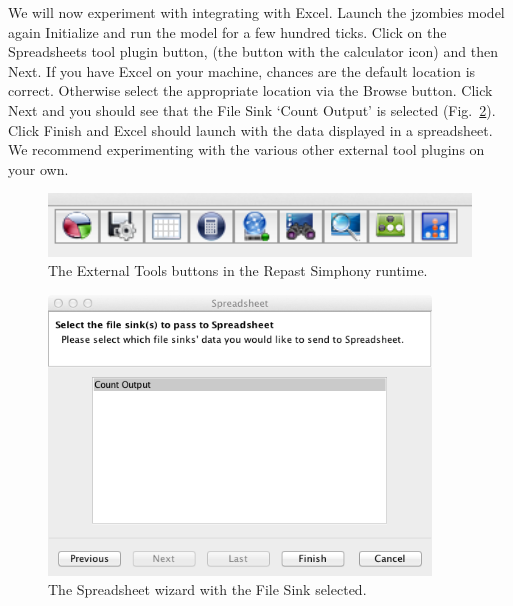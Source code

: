\documentclass[11pt]{amsart}
\begin{document}
We will now experiment with integrating with Excel. Launch the jzombies model again Initialize and run the model for a few hundred ticks.  Click on the Spreadsheets tool plugin button, (the button with the calculator icon) and then Next. If you have Excel on your machine, chances are the default location is correct. Otherwise select the appropriate location via the Browse button. Click Next and you should see that the File Sink `Count Output' is selected (Fig.~\ref{fig:spreadsheet}). Click Finish and Excel should launch with the data displayed in a spreadsheet. We recommend experimenting with the various other external tool plugins on your own.

\begin{figure}
\begin{center}
\vspace{.2in}
\centerline {
\includegraphics[width=5in]{GettingStartedImages/ExternalTools.png}
}
\caption{The External Tools buttons in the Repast Simphony runtime.}
\label{fig:externaltools}
\end{center}
\end{figure}

\begin{figure}
\begin{center}
\vspace{.2in}
\centerline {
\includegraphics[width=4in]{GettingStartedImages/Spreadsheet.png}
}
\caption{The Spreadsheet wizard with the File Sink selected.}
\label{fig:spreadsheet}
\end{center}
\end{figure}
\end{document}
